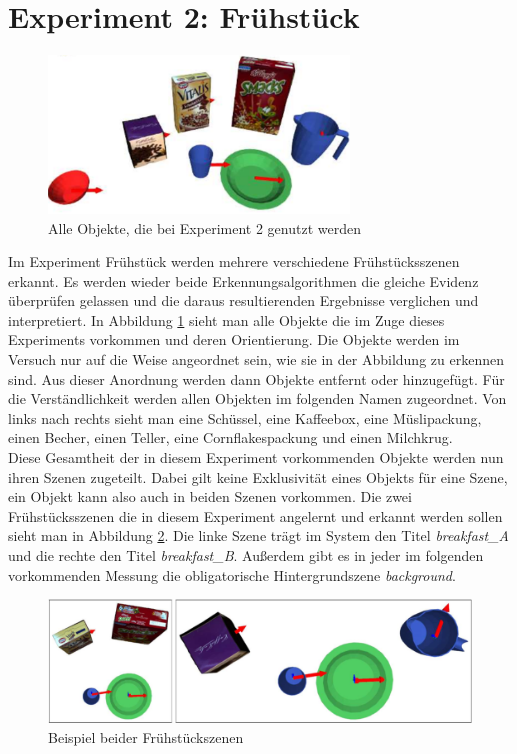 \section{Experiment 2: Frühstück}\label{sec:ex2}
\begin{figure}
	\centering
	\includegraphics[width=8cm]{bilder/allobjects.pdf}
	\caption{Alle Objekte, die bei Experiment 2 genutzt werden \cite{gassner17}}
	\label{img:allobjects}
\end{figure}
Im Experiment Frühstück werden mehrere verschiedene Frühstücksszenen erkannt. Es werden wieder beide Erkennungsalgorithmen die gleiche Evidenz überprüfen gelassen und die daraus resultierenden Ergebnisse verglichen und interpretiert. In Abbildung \ref{img:allobjects} sieht man alle Objekte die im Zuge dieses Experiments vorkommen und deren Orientierung. Die Objekte werden im Versuch nur auf die Weise angeordnet sein, wie sie in der Abbildung zu erkennen sind. Aus dieser Anordnung werden dann Objekte entfernt oder hinzugefügt. Für die Verständlichkeit werden allen Objekten im folgenden Namen zugeordnet. Von links nach rechts sieht man eine Schüssel, eine Kaffeebox, eine Müslipackung, einen Becher, einen Teller, eine Cornflakespackung und einen Milchkrug.\smallskip\\
Diese Gesamtheit der in diesem Experiment vorkommenden Objekte werden nun ihren Szenen zugeteilt. Dabei gilt keine Exklusivität eines Objekts für eine Szene, ein Objekt kann also auch in beiden Szenen vorkommen. Die zwei Frühstücksszenen die in diesem Experiment angelernt und erkannt werden sollen sieht man in Abbildung \ref{img:fruehstueckexample}. Die linke Szene trägt im System den Titel \textit{breakfast\_A} und die rechte den Titel \textit{breakfast\_B}. Außerdem gibt es in jeder im folgenden vorkommenden Messung die obligatorische Hintergrundszene \textit{background}.\smallskip\\
\begin{figure}
	\centering
	\includegraphics[width=14cm]{bilder/fruehstueckszenen.pdf}
	\caption{Beispiel beider Fr{\"u}hst{\"u}ckszenen \cite{gassner17}}
	\label{img:fruehstueckexample}
\end{figure}

